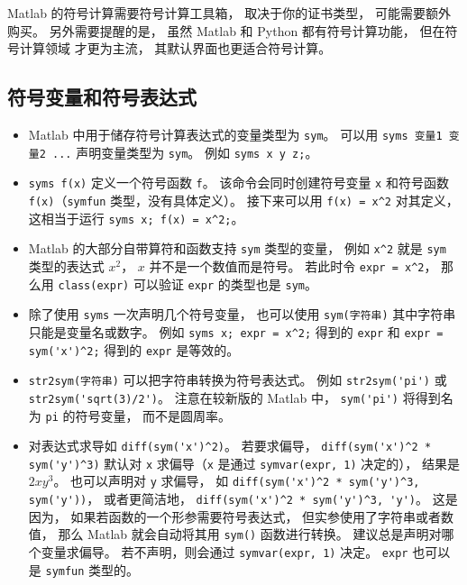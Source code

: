 

Matlab 的符号计算需要符号计算工具箱， 取决于你的证书类型， 可能需要额外购买。 另外需要提醒的是， 虽然 Matlab 和 Python 都有符号计算功能， 但在符号计算领域  才更为主流， 其默认界面也更适合符号计算。

\subsection{符号变量和符号表达式}
\begin{itemize}
\item Matlab 中用于储存符号计算表达式的变量类型为 \verb`sym`。 可以用 \verb`syms 变量1 变量2 ...` 声明变量类型为 \verb`sym`。 例如 \verb`syms x y z;`。

\item \verb`syms f(x)` 定义一个符号函数 \verb`f`。 该命令会同时创建符号变量 \verb`x` 和符号函数 \verb`f(x)`（\verb`symfun` 类型，没有具体定义）。 接下来可以用 \verb`f(x) = x^2` 对其定义， 这相当于运行 \verb`syms x; f(x) = x^2;`。

\item Matlab 的大部分自带算符和函数支持 \verb`sym` 类型的变量， 例如 \verb`x^2` 就是 \verb`sym` 类型的表达式 $x^2$， $x$ 并不是一个数值而是符号。 若此时令 \verb`expr = x^2`， 那么用 \verb`class(expr)` 可以验证 \verb`expr` 的类型也是 \verb`sym`。

\item 除了使用 \verb`syms` 一次声明几个符号变量， 也可以使用 \verb`sym(字符串)` 其中字符串只能是变量名或数字。 例如 \verb`syms x; expr = x^2;` 得到的 \verb`expr` 和 \verb`expr = sym('x')^2;` 得到的 \verb`expr` 是等效的。

\item \verb`str2sym(字符串)` 可以把字符串转换为符号表达式。 例如 \verb`str2sym('pi')` 或 \verb`str2sym('sqrt(3)/2')`。 注意在较新版的 Matlab 中， \verb`sym('pi')` 将得到名为 \verb`pi` 的符号变量， 而不是圆周率。

\item  对表达式求导如 \verb`diff(sym('x')^2)`。 若要求偏导， \verb`diff(sym('x')^2 * sym('y')^3)` 默认对 \verb`x` 求偏导（\verb`x` 是通过 \verb`symvar(expr, 1)` 决定的）， 结果是 $2x y^3$。 也可以声明对 \verb`y` 求偏导， 如 \verb`diff(sym('x')^2 * sym('y')^3, sym('y'))`， 或者更简洁地， \verb`diff(sym('x')^2 * sym('y')^3, 'y')`。 这是因为， 如果若函数的一个形参需要符号表达式， 但实参使用了字符串或者数值， 那么 Matlab 就会自动将其用 \verb`sym()` 函数进行转换。 建议总是声明对哪个变量求偏导。 若不声明，则会通过 \verb`symvar(expr, 1)` 决定。 \verb`expr` 也可以是 \verb`symfun` 类型的。


\end{itemize}

